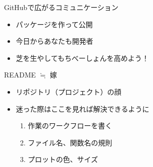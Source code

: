\documentclass[ignorenonframetext,]{beamer}
\begin{document}
\begin{frame}{GitHubで広がるコミュニケーション}

\begin{itemize}
\itemsep1pt\parskip0pt
\item
  パッケージを作って公開
\item
  今日からあなたも開発者
\item
  芝を生やしてもちべーしょんを高めよう！
\end{itemize}


\end{frame}

\begin{frame}{README $\fallingdotseq$ 嫁}

\begin{itemize}
\itemsep1pt\parskip0pt
\item
  リポジトリ（プロジェクト）の顔
\item
  迷った際はここを見れば解決できるように

  \begin{enumerate}
  \def\labelenumi{\arabic{enumi}.}
  \itemsep1pt\parskip0pt
  \item
    作業のワークフローを書く
  \item
    ファイル名、関数名の規則
  \item
    プロットの色、サイズ
  \end{enumerate}
\end{itemize}

\end{frame}
\end{document}
